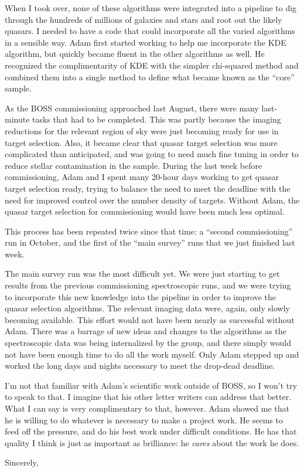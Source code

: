 \documentclass[12pt]{letter}
\begin{document}
\begin{letter}{}
When I took over, none of these algorithms were integrated into a pipeline to
dig through the hundreds of millions of galaxies and stars and root out the
likely quasars.  I needed to have a code that could incorporate all the varied
algorithms in a sensible way.  Adam first started working to help me
incorporate the KDE algorithm, but quickly became fluent in the other
algorithms as well.  He recognized the complimentarity of KDE with the simpler
chi-squared method and combined them into a single method to define what became
known as the ``core'' sample.  

As the BOSS commissioning approached last August, there were many last-minute
tasks that had to be completed. This was partly because the imaging reductions
for the relevant region of sky were just becoming ready for use in target
selection.  Also, it became clear that quasar target selection was more
complicated than anticipated, and was going to need much fine tuning in order
to reduce stellar contamination in the sample.  During the last week before
commissioning, Adam and I spent many 20-hour days working to get quasar target
selection ready, trying to balance the need to meet the deadline with the need
for improved control over the number density of targets.  Without Adam, the
quasar target selection for commissioning would have been much less optimal.

This process has been repeated twice since that time:  a ``second
commissioning'' run in October, and the first of the ``main survey'' runs that
we just finished last week.  

The main survey run was the most difficult yet.  We were just starting to get
results from the previous commissioning spectroscopic runs, and we were trying
to incorporate this new knowledge into the pipeline in order to improve the
quasar selection algorithms.  The relevant imaging data were, again, only
slowly becoming available.  This effort would not have been nearly as
successful without Adam.  There was a barrage of new ideas and changes to the
algorithms as the spectroscopic data was being internalized by the group, and
there simply would not have been enough time to do all the work myself.  Only
Adam stepped up and worked the long days and nights necessary to meet the
drop-dead deadline.

I'm not that familiar with Adam's scientific work outside of BOSS, so I won't
try to speak to that.  I imagine that his other letter writers can address that
better.   What I can say is very complimentary to that, however.  Adam showed
me that he is willing to do whatever is necessary to make a project work.  He
seems to feed off the pressure, and do his best work under difficult
conditions.  He has that quality I think is just as important as brilliance: he
{\it cares} about the work he does.

\closing{Sincerely, }

\end{letter}
\end{document}
